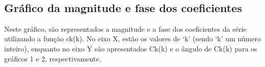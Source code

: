 \documentclass{article}
\begin{document}
    \begin{center}
    \end{center}
    { \hspace*{\fill} \\}
    
    \hypertarget{gruxe1fico-da-magnitude-e-fase-dos-coeficientes}{%
\subsection{Gráfico da magnitude e fase dos
coeficientes}\label{gruxe1fico-da-magnitude-e-fase-dos-coeficientes}}

Neste gráfico, são representados a magnitude e a fase dos coeficientes
da série utilizando a função ck(k). No eixo X, estão os valores de `k'
(sendo `k' um número inteiro), enquanto no eixo Y são apresentados
\textbar Ck(k)\textbar{} e o ângulo de Ck(k) para os gráficos 1 e 2,
respectivamente.
\end{document}
